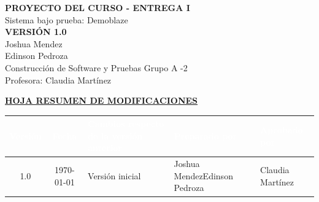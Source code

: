 \documentclass[11pt,a4paper]{article}
\begin{document}
\thispagestyle{plantilla}

\vspace*{5.5cm}
\begin{center}
{\fontsize{26}{30}\selectfont\bfseries PROYECTO DEL CURSO - ENTREGA I}\\[0.5cm]
{\large Sistema bajo prueba: Demoblaze}\\[1.6cm]
{\large\bfseries VERSIÓN 1.0}\\[2.5cm]
{\normalsize Joshua Mendez}\\[0.15cm]
{\normalsize Edinson Pedroza}\\[0.25cm]
{\normalsize Construcción de Software y Pruebas \quad Grupo A -2}\\[0.25cm]
{\normalsize Profesora: Claudia Martínez}
\end{center}
\clearpage

\vspace*{0.8cm}
\begin{center}\underline{\textbf{\large HOJA RESUMEN DE MODIFICACIONES}}\end{center}
\vspace{0.6cm}
{\small
\renewcommand{\arraystretch}{1.5}
\noindent\begin{tabularx}{\textwidth}{|c|c|Y|L{2.7cm}|L{2.7cm}|}
\hline
{}
\textcolor{white}{\textbf{Versión}} & \textcolor{white}{\textbf{Fecha}} & \textcolor{white}{\textbf{Cambios respecto de la versión anterior}} & \textcolor{white}{\textbf{Preparado por}} & \textcolor{white}{\textbf{Aprobado por}}\\
 & \today & Versión inicial & Joshua Mendez\newline Edinson Pedroza & Claudia Martínez\\
\hline
\end{tabularx}}
\clearpage

\renewcommand{\contentsname}{ÍNDICE}
\renewcommand{\cfttoctitlefont}{\hfill\large\bfseries}
\renewcommand{\cftaftertoctitle}{\hfill}
\tableofcontents
\clearpage



\FloatBarrier
\end{document}
